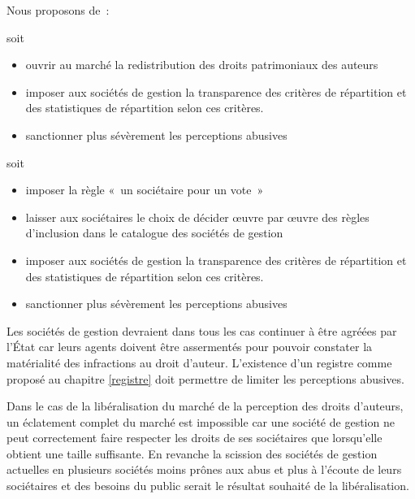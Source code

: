 \begin{mesure}
Nous proposons de~:

\begin{description}
\item soit
	\begin{itemize}
	\item ouvrir au marché la redistribution des droits patrimoniaux des auteurs
	\item imposer aux sociétés de gestion la transparence des critères de répartition et des statistiques de répartition selon ces critères.
	\item sanctionner plus sévèrement les perceptions abusives
	\end{itemize}

\item soit 
	\begin{itemize}
	\item imposer la règle «~un sociétaire pour un vote~»
	\item laisser aux sociétaires le choix de décider œuvre par œuvre des règles d'inclusion dans le catalogue des sociétés de gestion
	\item imposer aux sociétés de gestion la transparence des critères de répartition et des statistiques de répartition selon ces critères.
	\item sanctionner plus sévèrement les perceptions abusives
	\end{itemize}
\end{description}
\end{mesure}

Les sociétés de gestion devraient dans tous les cas continuer à être agréées par l'État car leurs agents doivent être assermentés pour pouvoir constater la matérialité des infractions au droit d'auteur. L'existence d'un registre comme proposé au chapitre \ref{registre} doit permettre de limiter les perceptions abusives.

Dans le cas de la libéralisation du marché de la perception des droits d'auteurs, un éclatement complet du marché est impossible car une société de gestion ne peut correctement faire respecter les droits de ses sociétaires que lorsqu'elle obtient une taille suffisante. En revanche la scission des sociétés de gestion actuelles en plusieurs sociétés moins prônes aux abus et plus à l'écoute de leurs sociétaires et des besoins du public serait le résultat souhaité de la libéralisation.

